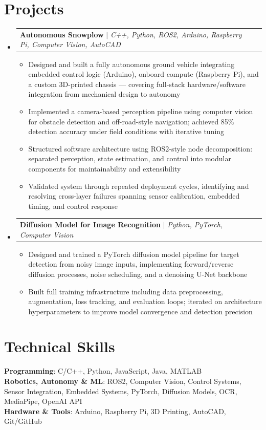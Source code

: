 \documentclass[letterpaper,11pt]{article}
\makeatletter
\newcommand{\resumeItem}[1]{
  \item\small{
    {#1 \vspace{-2pt}}
  }
}
\newcommand{\resumeProjectHeading}[2]{
    \item
    \begin{tabular*}{0.97\textwidth}{l@{\extracolsep{\fill}}r}
      \small#1 & #2 \\
    \end{tabular*}\vspace{-7pt}
}
\newcommand{\resumeSubHeadingListStart}{\begin{itemize}[leftmargin=0.15in, label={}]}
\newcommand{\resumeSubHeadingListEnd}{\end{itemize}}
\newcommand{\resumeItemListStart}{\begin{itemize}}
\newcommand{\resumeItemListEnd}{\end{itemize}\vspace{-5pt}}
\makeatother
\begin{document}
\section{Projects}
    \resumeSubHeadingListStart
      \resumeProjectHeading
          {\textbf{Autonomous Snowplow} $|$ \emph{C++, Python, ROS2, Arduino, Raspberry Pi, Computer Vision, AutoCAD}}{}
          \resumeItemListStart
            \resumeItem{Designed and built a fully autonomous ground vehicle integrating embedded control logic (Arduino), onboard compute (Raspberry Pi), and a custom 3D-printed chassis --- covering full-stack hardware/software integration from mechanical design to autonomy}
            \resumeItem{Implemented a camera-based perception pipeline using computer vision for obstacle detection and off-road-style navigation; achieved 85\% detection accuracy under field conditions with iterative tuning}
            \resumeItem{Structured software architecture using ROS2-style node decomposition: separated perception, state estimation, and control into modular components for maintainability and extensibility}
            \resumeItem{Validated system through repeated deployment cycles, identifying and resolving cross-layer failures spanning sensor calibration, embedded timing, and control response}
          \resumeItemListEnd
      \resumeProjectHeading
          {\textbf{Diffusion Model for Image Recognition} $|$ \emph{Python, PyTorch, Computer Vision}}{}
          \resumeItemListStart
            \resumeItem{Designed and trained a PyTorch diffusion model pipeline for target detection from noisy image inputs, implementing forward/reverse diffusion processes, noise scheduling, and a denoising U-Net backbone}
            \resumeItem{Built full training infrastructure including data preprocessing, augmentation, loss tracking, and evaluation loops; iterated on architecture hyperparameters to improve model convergence and detection precision}
          \resumeItemListEnd
    \resumeSubHeadingListEnd


\vspace{-6pt}
\section{Technical Skills}
 \begin{itemize}[leftmargin=0.15in, label={}]
    \small{\item{
     \textbf{Programming}{: C/C++, Python, JavaScript, Java, MATLAB} \\
     \textbf{Robotics, Autonomy \& ML}{: ROS2, Computer Vision, Control Systems, Sensor Integration, Embedded Systems, PyTorch, Diffusion Models, OCR, MediaPipe, OpenAI API} \\
     \textbf{Hardware \& Tools}{: Arduino, Raspberry Pi, 3D Printing, AutoCAD, Git/GitHub}
    }}
 \end{itemize}


\end{document}
